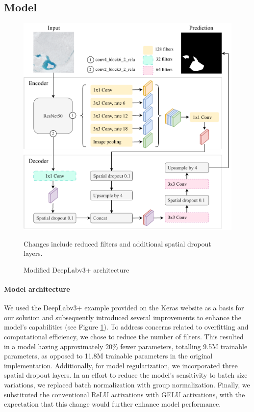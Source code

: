 \documentclass[sigconf]{acmart}
\begin{document}
\subsection{Model}

\begin{figure}[t!]
\includegraphics[width=\columnwidth]{images/deeplabv3plus.pdf}
\caption{Modified DeepLabv3+ architecture}
\small Changes include reduced filters and additional spatial dropout layers.
\label{fig:figure2}
\end{figure}

\paragraph{Model architecture} 
We used the DeepLabv3+ example provided on the Keras website\cite{Rakshit} as a basis for our solution and subsequently introduced several improvements to enhance the model's capabilities (see Figure \ref{fig:figure2}). To address concerns related to overfitting and computational efficiency, we chose to reduce the number of filters. This resulted in a model having approximately $20\%$ fewer parameters, totalling 9.5M trainable parameters, as opposed to 11.8M trainable parameters in the original implementation. Additionally, for model regularization, we incorporated three spatial dropout\cite{spatialdropout} layers. In an effort to reduce the model's sensitivity to batch size variations, we replaced batch normalization with group normalization\cite{wu2018group}. Finally, we substituted the conventional ReLU activations with GELU activations\cite{hendrycks2023gaussian}, with the expectation that this change would further enhance model performance.
\end{document}
